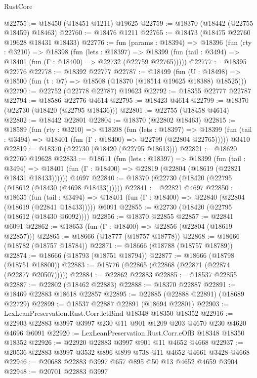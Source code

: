 \begin{lexlean}{RustCore}
\begin{coremodule}
@22755 := @18450 (@18451 @1211) @19625
@22759 := @18370 (@18442 (@22755 @18459) @18463)
@22760 := @18476 @1211
@22765 := @18473 (@18475 @22760 @19628 @18431 @18433)
@22776 := fun (params : @18394) =>
  @18396
    (fun (rty : @3210) =>
    @18398
      (fun (lets : @18397) =>
      @18399 (fun (tail : @3494) => @18401 (fun (Γ : @18400) => @22732 (@22759 @22765)))))
@22777 := @18395 @22776
@22778 := @18392 @22777
@22787 := @18499
    (fun (U : @18498) => @18500 (fun (t : @7) => @18508 (@18370 (@18514 @19625 @18388) @18525)))
@22790 := @22752 (@22778 @22787) @19623
@22792 := @18355 @22777 @22787
@22794 := @18586 @22776 @4614
@22795 := @18423 @4614
@22799 := @18370 (@22730 (@18420 (@22795 @18436)))
@22801 := @22755 (@18458 @4614)
@22802 := @18442 @22801
@22804 := @18370 (@22802 @18463)
@22815 := @18589
    (fun (rty : @3210) =>
    @18398
      (fun (lets : @18397) =>
      @18399 (fun (tail : @3494) => @18401 (fun (Γ : @18400) => @22799 (@22804 @22765)))))
    @3410
@22819 := @18370 (@22730 (@18420 (@22795 @18613)))
@22821 := @18620 @22760 @19628
@22833 := @18611
    (fun (lets : @18397) =>
    @18399
      (fun (tail : @3494) =>
      @18401 (fun (Γ : @18400) => @22819 (@22804 (@18619 (@22821 @18431 @18433))))))
    @4697
@22840 := @18370 (@22730 (@18420 (@22795 (@18612 (@18430 (@4698 @18433))))))
@22841 := @22821 @4697
@22850 := @18635
    (fun (tail : @3494) => @18401 (fun (Γ : @18400) => @22840 (@22804 (@18619 (@22841 @18433)))))
    @6091
@22855 := @22730 (@18420 (@22795 (@18612 (@18430 @6092))))
@22856 := @18370 @22855
@22857 := @22841 @6091
@22862 := @18653 (fun (Γ : @18400) => @22856 (@22804 (@18619 @22857)))
@22865 := @18666 (@18777 (@18757 @18778))
@22868 := @18666 (@18782 (@18757 @18784))
@22871 := @18666 (@18788 (@18757 @18789))
@22874 := @18666 (@18793 (@18751 @18794))
@22877 := @18666 (@18798 (@18751 @18800))
@22883 := @18776 (@22865 (@22868 (@22871 (@22874 (@22877 @20507)))))
@22884 := @22862 @22883
@22885 := @18537 @22855
@22887 := @22802 (@18462 @22883)
@22888 := @18370 @22887
@22891 := @18469 @22883 @18618 @22857
@22895 := @22885 (@22888 @22891) (@18689 @22729)
@22899 := @18537 @22887 @22891 (@18694 @22801)
@22903 := LexLeanPreservation.Rust.Corr.letBind @18348 @18350 @18352
@22916 := @22903 @22883 @3997 @3997 @230 @11 @901 @1209 @203 @4670 @230 @4620 @4696 @6091
@22920 := LexLeanPreservation.Rust.Corr.eOfB @18348 @18350 @18352
@22926 := @22920 @22883 @3997 @901 @11 @4652 @4668
@22937 := @20536 @22883 @3997 @3532 @896 @899 @738 @11 @4652 @4661 @3428 @4668
@22946 := @20688 @22883 @3997 @657 @895 @50 @13 @4652 @4659 @3904
@22948 := @20701 @22883 @3997

\end{coremodule}
\end{lexlean}

